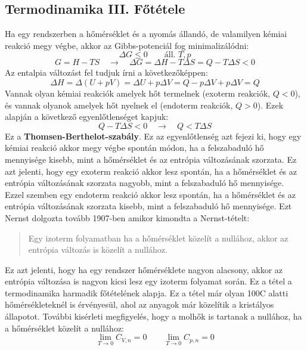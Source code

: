 \documentclass[a4paper,12pt]{article}
\begin{document}
\subsection{Termodinamika III. Főtétele}
Ha egy rendszerben a hőmérséklet és a nyomás állandó, de valamilyen kémiai reakció megy végbe, akkor az Gibbs-potenciál fog minimalizálódni:
\begin{equation}
    \Delta G \leq 0 \qquad \text{áll. } T, p
\end{equation}
\begin{equation}
    G = H - TS \quad \to \quad \Delta G = \Delta H - T \Delta S = Q - T \Delta S < 0
\end{equation}
Az entalpia változást fel tudjuk írni a következőképpen:
\begin{equation}
    \Delta H =  \Delta (U + pV) = \Delta U + p\Delta V = Q - p \Delta V + p \Delta V = Q
\end{equation}
Vannak olyan kémiai reakciók amelyek hőt termelnek (exoterm reakciók, $Q < 0$), és vannak olyanok amelyek hőt nyelnek el (endoterm reakciók, $Q > 0$). 
Ezek alapján a következő egyenlőtlenséget kapjuk:
\begin{equation}
    Q - T \Delta S < 0 \quad \to \quad Q < T \Delta S
\end{equation}
Ez a \textbf{Thomsen-Berthelot-szabály}. Ez az egyenlőtlenség azt fejezi ki, hogy egy kémiai reakció akkor megy végbe spontán módon, ha a felszabaduló hő mennyisége kisebb, mint a hőmérséklet és az entrópia változásának szorzata.
Ez azt jelenti, hogy egy exoterm reakció akkor lesz spontán, ha a hőmérséklet és az entrópia változásának szorzata nagyobb, mint a felszabaduló hő mennyisége.
Ezzel szemben egy endoterm reakció akkor lesz spontán, ha a hőmérséklet és az entrópia változásának szorzata kisebb, mint a felszabaduló hő mennyisége. Ezt Nernst dolgozta tovább
1907-ben amikor kimondta a Nernst-tételt:
\begin{quote}
    Egy izoterm folyamatban ha a hőmérséklet közelít a nullához, akkor az entrópia változás is közelít a nullához.
\end{quote}
Ez azt jelenti, hogy ha egy rendszer hőmérséklete nagyon alacsony, akkor az entrópia változása is nagyon kicsi lesz egy izoterm folyamat során. Ez a tétel a termodinamika harmadik főtételének alapja.
Ez a tétel már olyan 100\degree C alatti hőmérsékleteknél is érvényesül, ahol az anyagok már közelítik a kristályos állapotot. További kisérleti megfigyelés, hogy
a molhők is tartanak a nullához, ha a hőmérséklet közelít a nullához:
\begin{equation}
    \lim_{T \to 0} C_{V,n} = 0 \qquad \lim_{T \to 0} C_{p,n} = 0
\end{equation}
\end{document}
